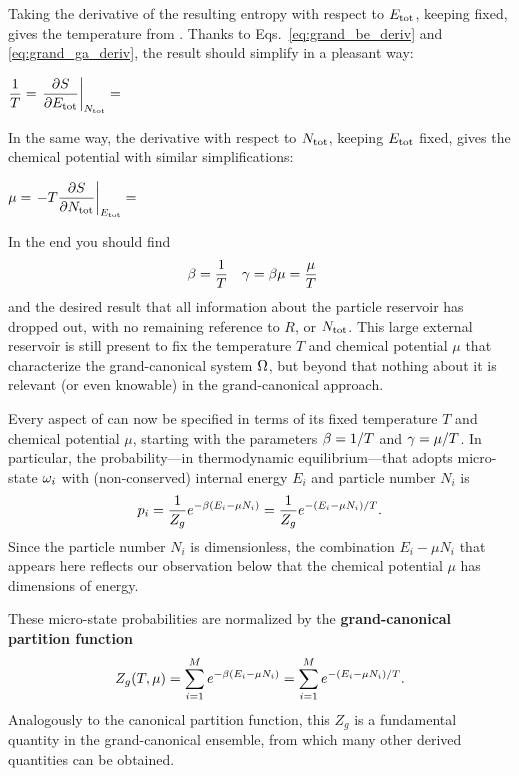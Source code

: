 Taking the derivative of the resulting entropy with respect to $E_{\text{tot}}$, keeping \Ntot fixed, gives the temperature from .
Thanks to Eqs.~\ref{eq:grand_be_deriv} and \ref{eq:grand_ga_deriv}, the result should simplify in a pleasant way:
\begin{mdframed}
  $\displaystyle \frac{1}{T} = \left. \frac{\partial S}{\partial E_{\text{tot}}}\right|_{N_{\text{tot}}} = $ \\[100 pt]
\end{mdframed}
In the same way, the derivative with respect to $N_{\text{tot}}$, keeping $E_{\text{tot}}$ fixed, gives the chemical potential with similar simplifications:
\begin{mdframed}
  $\displaystyle \mu = \left. -T \frac{\partial S}{\partial N_{\text{tot}}}\right|_{E_{\text{tot}}} = $ \\[100 pt]
\end{mdframed}
In the end you should find
\begin{align}
  \beta & = \frac{1}{T} &
  \gamma & = \beta \mu = \frac{\mu}{T}
\end{align}
and the desired result that all information about the particle reservoir has dropped out, with no remaining reference to $R$, \Etot or $N_{\text{tot}}$.
This large external reservoir is still present to fix the temperature $T$ and chemical potential $\mu$ that characterize the grand-canonical system $\Omega$, but beyond that nothing about it is relevant (or even knowable) in the grand-canonical approach.

Every aspect of \Om can now be specified in terms of its fixed temperature $T$ and chemical potential $\mu$, starting with the parameters $\beta = 1 / T$ and $\gamma = \mu / T$.
In particular, the probability---in thermodynamic equilibrium---that \Om adopts micro-state $\omega_i$ with (non-conserved) internal energy $E_i$ and particle number $N_i$ is
\begin{equation}
  \label{eq:grand_prob}
  p_i = \frac{1}{Z_g} e^{-\beta (E_i - \mu N_i)} = \frac{1}{Z_g} e^{-(E_i - \mu N_i) / T}.
\end{equation}
Since the particle number $N_i$ is dimensionless, the combination $E_i - \mu N_i$ that appears here reflects our observation below  that the chemical potential $\mu$ has dimensions of energy.

\begin{shaded}
  These micro-state probabilities are normalized by the \textbf{grand-canonical partition function}
  \begin{equation}
    \label{eq:grand_part_func}
    Z_g(T, \mu) = \sum_{i = 1}^M e^{-\beta (E_i - \mu N_i)} = \sum_{i = 1}^M e^{-(E_i - \mu N_i) / T}.
  \end{equation}
  Analogously to the canonical partition function, this $Z_g$ is a fundamental quantity in the grand-canonical ensemble, from which many other derived quantities can be obtained.
\end{shaded}



